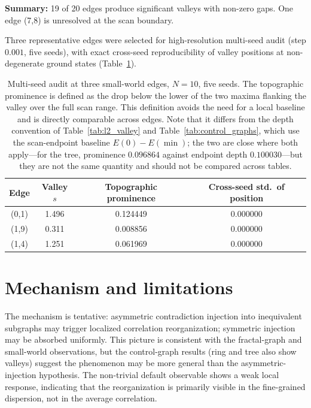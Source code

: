 \documentclass[pdflatex,sn-mathphys-num,iicol]{sn-jnl}
\begin{document}
\textbf{Summary:} 19 of 20 edges produce significant valleys with non-zero gaps. One edge (7,8) is unresolved at the scan boundary.

Three representative edges were selected for high-resolution multi-seed audit (step $0.001$, five seeds), with exact cross-seed reproducibility of valley positions at non-degenerate ground states (Table~\ref{tab:sw_multiseed}).

\begin{table}[t]
\centering
\caption{Multi-seed audit at three small-world edges, $N=10$, five seeds. The topographic prominence is defined as the drop below the lower of the two maxima flanking the valley over the full scan range. This definition avoids the need for a local baseline and is directly comparable across edges. Note that it differs from the depth convention of Table~\ref{tab:l2_valley} and Table~\ref{tab:control_graphs}, which use the scan-endpoint baseline $E(0)-E(\min)$; the two are close where both apply---for the tree, prominence $0.096864$ against endpoint depth $0.100030$---but they are not the same quantity and should not be compared across tables.}
\label{tab:sw_multiseed}
\begin{tabular}{cccc}
\toprule
Edge & Valley $s$ & Topographic prominence & Cross-seed std.\ of position \\
\midrule
(0,1) & 1.496 & 0.124449 & 0.000000 \\
(1,9) & 0.311 & 0.008856 & 0.000000 \\
(1,4) & 1.251 & 0.061969 & 0.000000 \\
\bottomrule
\end{tabular}
\end{table}

\section{Mechanism and limitations}

The mechanism is tentative: asymmetric contradiction injection into inequivalent subgraphs may trigger localized correlation reorganization; symmetric injection may be absorbed uniformly. This picture is consistent with the fractal-graph and small-world observations, but the control-graph results (ring and tree also show valleys) suggest the phenomenon may be more general than the asymmetric-injection hypothesis. The non-trivial default observable shows a weak local response, indicating that the reorganization is primarily visible in the fine-grained dispersion, not in the average correlation.
\end{document}
